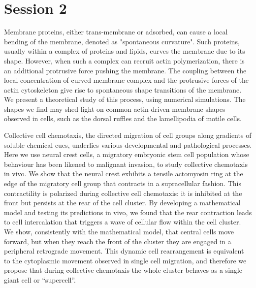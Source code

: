 \documentclass{article}
\begin{document}
\section*{Session 2}




{
Membrane proteins, either trans-membrane or adsorbed, can cause a local bending of the membrane, denoted as "spontaneous curvature". Such proteins, usually within a complex of proteins and lipids, curves the membrane due to its shape. However, when such a complex can recruit actin polymerization, there is an additional protrusive force pushing the membrane. The coupling between the local concentration of curved membrane complex and the protrusive forces of the actin cytoskeleton give rise to spontaneous shape transitions of the membrane. We present a theoretical study of this process, using numerical simulations. The shapes we find may shed light on common actin-driven membrane shapes observed in cells, such as the dorsal ruffles and the lamellipodia of motile cells.

}

{
Collective cell chemotaxis, the directed migration of cell groups along gradients of soluble chemical cues, underlies various developmental and pathological processes. Here we use neural crest cells, a migratory embryonic stem cell population whose behaviour has been likened to malignant invasion, to study collective chemotaxis in vivo. We show that the neural crest exhibits a tensile actomyosin ring at the edge of the migratory cell group that contracts in a supracellular fashion. This contractility is polarized during collective cell chemotaxis: it is inhibited at the front but persists at the rear of the cell cluster. By developing a mathematical model and testing its predictions in vivo, we found that the rear contraction leads to cell intercalation that triggers a wave of cellular flow within the cell cluster.  We show, consistently with the mathematical model, that central cells move forward, but when they reach the front of the cluster they are engaged in a peripheral retrograde movement.  This dynamic cell rearrangement is equivalent to the cytoplasmic movement observed in single cell migration, and therefore we propose that during collective chemotaxis the whole cluster behaves as a single giant cell or “supercell”.
}
\end{document}
